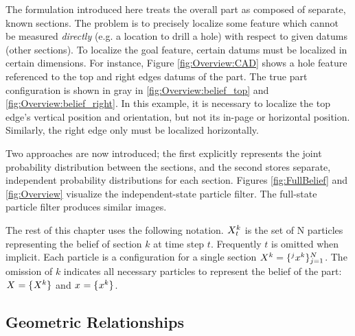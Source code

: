 \documentclass[../thesis.tex]{subfiles}
\begin{document}
The formulation introduced here treats the overall part as composed of separate, known sections. 
The problem is to precisely localize some feature which cannot be measured \textit{directly} (e.g. a location to drill a hole) with respect to given datums (other sections). 
To localize the goal feature, certain datums must be localized in certain dimensions.
For instance, Figure \ref{fig:Overview:CAD} shows a hole feature referenced to the top and right edges datums of the part.
The true part configuration is shown in gray in \ref{fig:Overview:belief_top} and \ref{fig:Overview:belief_right}.
In this example, it is necessary to localize the top edge's vertical position and orientation, but not its in-page or horizontal position. 
Similarly, the right edge only must be localized horizontally.


Two approaches are now introduced; the first explicitly represents
the joint probability distribution between the sections, and the second stores separate,
independent probability distributions for each section.
Figures \ref{fig:FullBelief} and \ref{fig:Overview} visualize the independent-state particle filter. The full-state particle filter produces similar images.

The rest of this chapter uses the following notation.
$\particles[t][][k]$ is the set of N particles representing the belief of section $k$ at time step $t$.
Frequently $t$ is omitted when implicit.
Each particle is a configuration for a single section $\particles[][][k] = \{\particle[][j][k]\}_{j=1}^{N}$.
The omission of $k$ indicates all necessary particles to represent the belief of the part: $\particles = \{\particles[][][k]\}$ and $\particle = \{\particle[][][k]\}$.



\subsection{Geometric Relationships}
\end{document}
